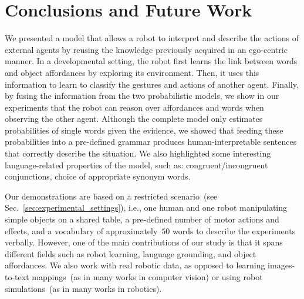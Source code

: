
\section{Conclusions and Future Work}
\label{sec:conclusions}

We presented a model that allows a robot to interpret and describe the actions of external agents by reusing the knowledge previously acquired in an ego-centric manner.
In a developmental setting, the robot first learns the link between words and object affordances by exploring its environment.
Then, it uses this information to learn to classify the gestures and actions of another agent.
Finally, by fusing the information from the two probabilistic models, we show in our experiments that the robot can reason over affordances and words when observing the other agent.
Although the complete model only estimates probabilities of single words given the evidence, we showed that feeding these probabilities into a pre-defined grammar produces human-interpretable sentences that correctly describe the situation.
We also highlighted some interesting language-related properties of the model, such as:
congruent/incongruent conjunctions,
choice of appropriate synonym words.

Our demonstrations are based on a restricted scenario~(see Sec.~\ref{sec:experimental_settings}), i.e., one human and one robot manipulating simple objects on a shared table, a pre-defined number of motor actions and effects, and a vocabulary of approximately~$50$ words to describe the experiments verbally.
However, one of the main contributions of our study is that it spans different fields such as robot learning, language grounding, and object affordances.
We also work with real robotic data, as opposed to learning images-to-text mappings~(as in many works in computer vision) or using robot simulations~(as in many works in robotics).

